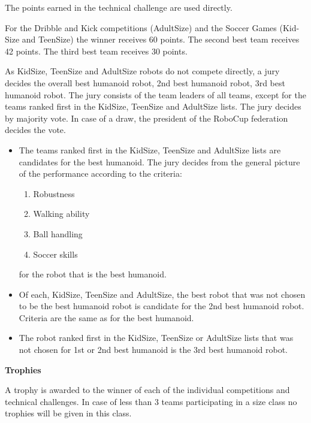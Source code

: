 \bigskip

The points earned in the technical challenge are used directly.

\bigskip

For the Dribble and Kick competitions (AdultSize) and the Soccer Games (Kid- Size and TeenSize) the winner receives 60 points. The second best team receives 42 points. The third best team receives 30 points.

\bigskip

As KidSize, TeenSize and AdultSize robots do not compete directly, a jury decides the overall best humanoid robot, 2nd best humanoid robot, 3rd best humanoid robot. The jury consists of the team leaders of all teams, except for the teams ranked first in the KidSize, TeenSize and AdultSize lists. The jury decides by majority vote. In case of a draw, the president of the RoboCup federation decides the vote.

\begin{itemize}
\item The teams ranked first in the KidSize, TeenSize and AdultSize lists are candidates for the best humanoid. The jury decides from the general picture of the performance according to the criteria:
\begin{enumerate}
\item Robustness
\item Walking ability
\item Ball handling
\item Soccer skills
\end{enumerate}
for the robot that is the best humanoid.
\item Of each, KidSize, TeenSize and AdultSize, the best robot that was not chosen to be the best humanoid robot is candidate for the 2nd best humanoid robot. Criteria are the same as for the best humanoid.
\item The robot ranked first in the KidSize, TeenSize or AdultSize lists that was not chosen for 1st or 2nd best humanoid is the 3rd best humanoid robot.
\end{itemize}

\bigskip

{\bfseries Trophies}

\headlinebox

A trophy is awarded to the winner of each of the individual competitions and technical challenges. In case of less than 3 teams participating in a size class no trophies will be given in this class.

\bigskip

